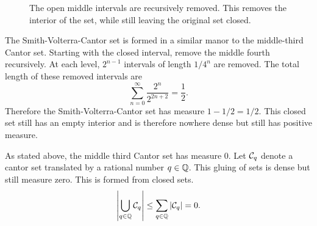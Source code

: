 \begin{figure}
    \begin{center}
    
\end{center}
\caption{The open middle intervals are recursively removed.  This removes the interior of the set, while still leaving the original set closed.  }
    \label{fig:my_label}
\end{figure}


\begin{example}
    The Smith-Volterra-Cantor set is formed in a similar manor to the middle-third Cantor set.  Starting with the closed interval, remove the middle fourth recursively.  At each level, $2^{n-1}$ intervals of length $1/4^n$ are removed.  The total length of these removed intervals are $$\sum_{n=0}^\infty \frac{2^n}{2^{2n+2}} = \frac{1}{2}.$$
    Therefore the Smith-Volterra-Cantor set has measure $1 - 1/2 = 1/2.$
    This closed set still has an empty interior and is therefore nowhere dense but still has positive measure. 
\end{example}

\begin{example}
As stated above, the middle third Cantor set has measure $0$.  Let $\mathcal{C}_q$ denote a cantor set translated by a rational number $q \in \mathbb{Q}$.  This gluing of sets is dense but still measure zero.  This is formed from closed sets. 
$$\left\vert \bigcup_{q \in \mathbb{Q}} \mathcal{C}_q \right\vert \leq  \sum_{q \in \mathbb{Q}}\left\vert\mathcal{C}_q\right\vert = 0.$$
\end{example}

